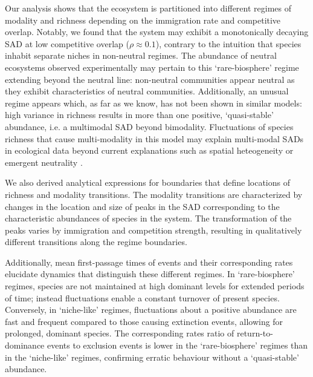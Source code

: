 \documentclass[9pt,twocolumn,twoside,lineno]{pnas-new}
\begin{document}
Our analysis shows that the ecosystem is partitioned into different regimes of modality and richness depending on the immigration rate and competitive overlap.
Notably, we found that the system may exhibit a monotonically decaying SAD at low competitive overlap ($\rho \approx 0.1$), contrary to the intuition that species inhabit separate niches in non-neutral regimes.
The abundance of neutral ecosystems observed experimentally may pertain to this `rare-biosphere' regime extending beyond the neutral line: non-neutral communities appear neutral as they exhibit characteristics of neutral communities.
Additionally, an unusual regime appears which, as far as we know, has not been shown in similar models: high variance in richness results in more than one positive, `quasi-stable' abundance, i.e. a multimodal SAD beyond bimodality.
Fluctuations of species richness that cause multi-modality in this model may explain multi-modal SADs in ecological data beyond current explanations such as spatial heteogeneity or emergent neutrality \cite{dornelas2008multiple,vergnon2012emergent}.

We also derived analytical expressions for boundaries that define locations of richness and modality transitions.
The modality transitions are characterized by changes in the location and size of peaks in the SAD corresponding to the characteristic abundances of species in the system.
The transformation of the peaks varies by immigration and competition strength, resulting in qualitatively different transitions along the regime boundaries.

Additionally, mean first-passage times of events and their corresponding rates elucidate dynamics that distinguish these different regimes.
In `rare-biosphere' regimes, species are not maintained at high dominant levels for extended periods of time; instead fluctuations enable a constant turnover of present species.
Conversely, in `niche-like' regimes, fluctuations about a positive abundance are fast and frequent compared to those causing extinction events, allowing for prolonged, dominant species.
The corresponding rates ratio of return-to-dominance events to exclusion events is lower in the `rare-biosphere' regimes than in the `niche-like' regimes, confirming erratic behaviour without a `quasi-stable' abundance.
\end{document}
